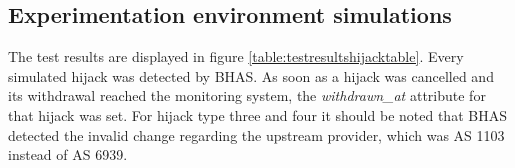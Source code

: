 \begin{figure}
\begin{floatrow}
\end{floatrow}
\end{figure}

\subsection{Experimentation environment simulations}\label{subsec:hijacksimulations}
The test results are displayed in figure \ref{table:testresultshijacktable}. Every simulated hijack was detected by BHAS. As soon as a hijack was cancelled and its withdrawal reached the monitoring system, the \emph{withdrawn\_at} attribute for that hijack was set. For hijack type three and four it should be noted that BHAS detected the invalid change regarding the upstream provider, which was AS 1103 instead of AS 6939. 

